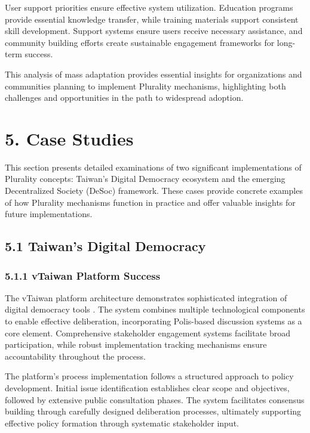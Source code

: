 User support priorities ensure effective system utilization. Education programs provide essential knowledge transfer, while training materials support consistent skill development. Support systems ensure users receive necessary assistance, and community building efforts create sustainable engagement frameworks for long-term success.

This analysis of mass adaptation provides essential insights for organizations and communities planning to implement Plurality mechanisms, highlighting both challenges and opportunities in the path to widespread adoption.

\hypertarget{case-studies}{%
\section{5. Case Studies}\label{case-studies}}

This section presents detailed examinations of two significant implementations of Plurality concepts: Taiwan's Digital Democracy ecosystem and the emerging Decentralized Society (DeSoc) framework. These cases provide concrete examples of how Plurality mechanisms function in practice and offer valuable insights for future implementations.

\hypertarget{taiwans-digital-democracy}{%
\subsection{5.1 Taiwan's Digital Democracy}\label{taiwans-digital-democracy}}

\hypertarget{vtaiwan-platform-success}{%
\subsubsection{5.1.1 vTaiwan Platform Success}\label{vtaiwan-platform-success}}

The vTaiwan platform architecture demonstrates sophisticated integration of digital democracy tools \citep{vtaiwan2023}. The system combines multiple technological components to enable effective deliberation, incorporating Polis-based discussion systems as a core element. Comprehensive stakeholder engagement systems facilitate broad participation, while robust implementation tracking mechanisms ensure accountability throughout the process.

The platform's process implementation follows a structured approach to policy development. Initial issue identification establishes clear scope and objectives, followed by extensive public consultation phases. The system facilitates consensus building through carefully designed deliberation processes, ultimately supporting effective policy formation through systematic stakeholder input.

